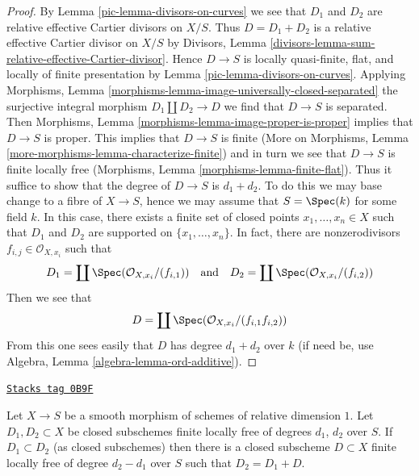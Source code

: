 \begin{proof}

By Lemma \ref{pic-lemma-divisors-on-curves} we see that $D_1$
and $D_2$ are relative effective Cartier divisors on $X/S$.
Thus $D = D_1 + D_2$ is a relative effective Cartier divisor
on $X/S$ by
Divisors, Lemma \ref{divisors-lemma-sum-relative-effective-Cartier-divisor}.
Hence $D \to S$ is locally quasi-finite, flat, and
locally of finite presentation by
Lemma \ref{pic-lemma-divisors-on-curves}.
Applying
Morphisms, Lemma \ref{morphisms-lemma-image-universally-closed-separated}
the surjective integral morphism $D_1 \amalg D_2 \to D$
we find that $D \to S$ is separated. Then
Morphisms, Lemma \ref{morphisms-lemma-image-proper-is-proper}
implies that $D \to S$ is proper.
This implies that $D \to S$ is finite
(More on Morphisms, Lemma \ref{more-morphisms-lemma-characterize-finite})
and in turn we see that $D \to S$ is finite locally free
(Morphisms, Lemma \ref{morphisms-lemma-finite-flat}).
Thus it suffice to show that the degree of $D \to S$ is $d_1 + d_2$.
To do this we may base change to a fibre of $X \to S$, hence we may
assume that $S = \Spec(k)$ for some field $k$.
In this case, there exists a finite set of closed points
$x_1, \ldots, x_n \in X$ such that $D_1$ and $D_2$
are supported on $\{x_1, \ldots, x_n\}$.
In fact, there are nonzerodivisors $f_{i, j} \in \mathcal{O}_{X, x_i}$
such that
$$
D_1 = \coprod \Spec(\mathcal{O}_{X, x_i}/(f_{i, 1}))
\quad\text{and}\quad
D_2 = \coprod \Spec(\mathcal{O}_{X, x_i}/(f_{i, 2}))
$$
Then we see that
$$
D = \coprod \Spec(\mathcal{O}_{X, x_i}/(f_{i, 1}f_{i, 2}))
$$
From this one sees easily that $D$ has degree $d_1 + d_2$
over $k$ (if need be, use Algebra, Lemma \ref{algebra-lemma-ord-additive}).
\end{proof}

\begin{lemma}
\label{pic-lemma-difference-divisors-on-curves}
\href{https://stacks.math.columbia.edu/tag/0B9F}{\texttt{Stacks tag 0B9F}}

Let $X \to S$ be a smooth morphism of schemes of relative dimension $1$.
Let $D_1, D_2 \subset X$ be closed subschemes finite locally free of
degrees $d_1$, $d_2$ over $S$. If $D_1 \subset D_2$ (as closed subschemes)
then there is a closed subscheme $D \subset X$ finite locally free of
degree $d_2 - d_1$ over $S$ such that $D_2 = D_1 + D$.
\end{lemma}

